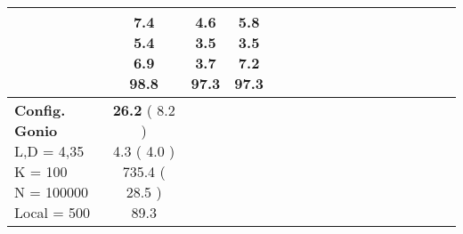 \documentclass[9pt]{article}
\begin{document}
\begin{landscape}
\begin{longtable}{ l | c c c c | c c c c | c c c c | c c c c |}
             &
                            \makecell{              7.4
     \\
            {\footnotesize             5.4
    } \\  {\footnotesize             6.9
     } \\
            {\small \textcolor[rgb]{ 0.224 , 0.677 , 0.1} {98.8  }
} }
             &                         \makecell{              4.6
     \\
            {\footnotesize             3.5
    } \\  {\footnotesize             3.7
     } \\
            {\small \textcolor[rgb]{ 0.254 , 0.646 , 0.1} {97.3  }
} }
             &
                            \makecell{              \textbf{ 5.8 }
     \\
            {\footnotesize             3.5
    } \\  {\footnotesize             7.2
     } \\
            {\small \textcolor[rgb]{ 0.254 , 0.646 , 0.1} {97.3  }
} }
            

 \\
                                                            
                    \hline
                    \makecell{ \textbf{ Config. Gonio} \\
                    { \small L,D = 4,35} \\
                    {\small K = 100} \\
                    {\small N = 100000 } \\ {\small Local = 500 }} &
                    
                            \makecell{              \textbf{ 26.2 }
     (             8.2
    ) \\
            {\footnotesize             4.3
     (              4.0
     )} \\
            {\footnotesize             735.4
     (            28.5
    ) } \\
            {\small  \textcolor[rgb]{ 0.414 , 0.486 , 0.1} {89.3  }
} }



\end{longtable}
\end{landscape}
\end{document}
